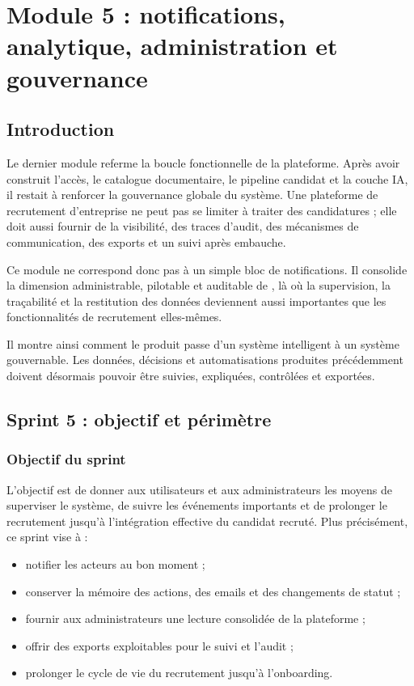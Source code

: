 \chapter{Module 5 : notifications, analytique, administration et gouvernance}

\section*{Introduction}
Le dernier module referme la boucle fonctionnelle de la plateforme. Après avoir construit l'accès, le catalogue documentaire, le pipeline candidat et la couche IA, il restait à renforcer la gouvernance globale du système. Une plateforme de recrutement d'entreprise ne peut pas se limiter à traiter des candidatures ; elle doit aussi fournir de la visibilité, des traces d'audit, des mécanismes de communication, des exports et un suivi après embauche.

Ce module ne correspond donc pas à un simple bloc de notifications. Il consolide la dimension administrable, pilotable et auditable de \projectname{}, là où la supervision, la traçabilité et la restitution des données deviennent aussi importantes que les fonctionnalités de recrutement elles-mêmes.

Il montre ainsi comment le produit passe d'un système intelligent à un système gouvernable. Les données, décisions et automatisations produites précédemment doivent désormais pouvoir être suivies, expliquées, contrôlées et exportées.

\section{Sprint 5 : objectif et périmètre}

\subsection{Objectif du sprint}
L'objectif est de donner aux utilisateurs et aux administrateurs les moyens de superviser le système, de suivre les événements importants et de prolonger le recrutement jusqu'à l'intégration effective du candidat recruté. Plus précisément, ce sprint vise à :
\begin{itemize}
  \item notifier les acteurs au bon moment ;
  \item conserver la mémoire des actions, des emails et des changements de statut ;
  \item fournir aux administrateurs une lecture consolidée de la plateforme ;
  \item offrir des exports exploitables pour le suivi et l'audit ;
  \item prolonger le cycle de vie du recrutement jusqu'à l'onboarding.
\end{itemize}

